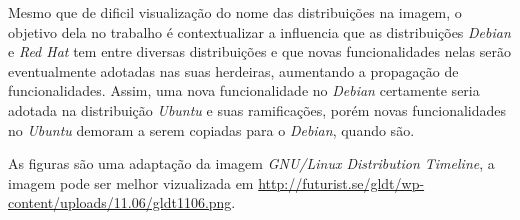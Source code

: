 \begin{anexosenv}
Mesmo que de dificil visualização do nome das distribuições na imagem, o objetivo dela no trabalho é contextualizar a influencia que as distribuições \textit{Debian} e \textit{Red Hat} tem entre diversas distribuições e que novas funcionalidades nelas serão eventualmente adotadas nas suas herdeiras, aumentando a propagação de funcionalidades. Assim, uma nova funcionalidade no \textit{Debian} certamente seria adotada na distribuição \textit{Ubuntu} e suas ramificações, porém novas funcionalidades no \textit{Ubuntu} demoram a serem copiadas para o \textit{Debian}, quando são. 

As figuras são uma adaptação da imagem \textit{GNU/Linux Distribution Timeline}, a imagem pode ser melhor vizualizada em \url{http://futurist.se/gldt/wp-content/uploads/11.06/gldt1106.png}.


\end{anexosenv}

